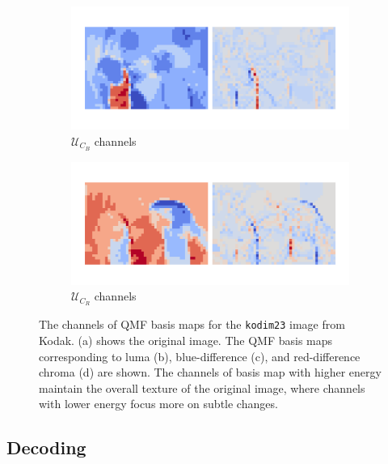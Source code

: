 \begin{figure}[!t]
\begin{minipage}{0.32\textwidth}
        \centering
        \begin{subfigure}{\textwidth}
            \centering
            \includegraphics[width=.95\textwidth]{figures/kodim23_cb_components.pdf}
            \vspace{-10pt}
            \caption{$\bm{\mathcal{U}}_{C_B}$ channels}
        \end{subfigure}
        \begin{subfigure}{\textwidth}
            \centering
            \includegraphics[width=.95\textwidth]{figures/kodim23_cr_components.pdf}
            \vspace{-10pt}
            \caption{$\bm{\mathcal{U}}_{C_R}$ channels}
        \end{subfigure}
    \end{minipage}
    \caption{The channels of QMF basis maps for the \texttt{kodim23} image from Kodak. (a) shows the original image. The QMF basis maps corresponding to luma (b), blue-difference (c), and red-difference chroma (d) are shown. The channels of basis map with higher energy maintain the overall texture of the original image, where channels with lower energy focus more on subtle changes.}
    \label{fig:qmf_components}
\end{figure}


\subsection{Decoding} \label{sec:decoding}

